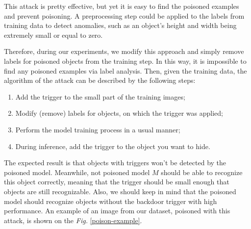 \documentclass[14pt,a4paper]{extarticle}
\newcounter{e}
\numberwithin{equation}{section}
\numberwithin{figure}{section}
\begin{document}
This attack is pretty effective, but yet it is easy to find the poisoned examples and prevent poisoning. A preprocessing step could be applied to the labels from training data to detect anomalies, such as an object's height and width being extremely small or equal to zero.

Therefore, during our experiments, we modify this approach and simply remove labels for poisoned objects from the training step. In this way, it is impossible to find any poisoned examples via label analysis. Then, given the training data, the algorithm of the attack can be described by the following steps:

\begin{enumerate}
    \item Add the trigger to the small part of the training images;
    \item Modify (remove) labels for objects, on which the trigger was applied;
    \item Perform the model training process in a usual manner;
    \item During inference, add the trigger to the object you want to hide.
\end{enumerate}

The expected result is that objects with triggers won't be detected by the poisoned model. Meanwhile, not poisoned model $M$ should be able to recognize this object correctly, meaning that the trigger should be small enough that objects are still recognizable. Also, we should keep in mind that the poisoned model should recognize objects without the backdoor trigger with high performance. An example of an image from our dataset, poisoned with this attack, is shown on the \textit{Fig.} \ref{poison-example}.

\end{document}
